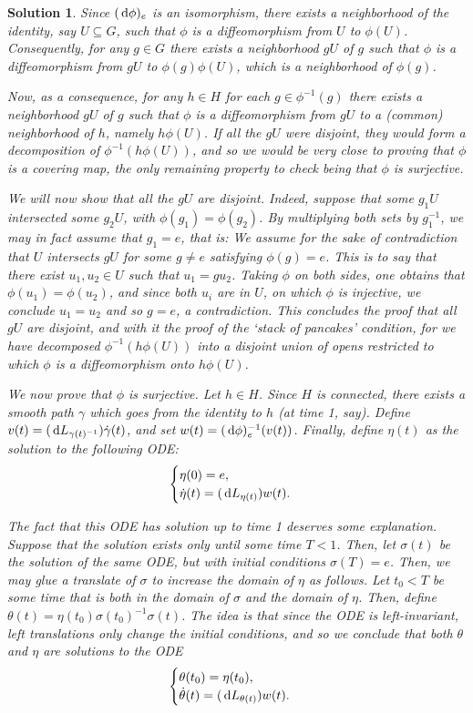 \documentclass{article}
\theoremstyle{nonumberplain}
\newtheorem{sol}{Solution}
\begin{document}
\begin{sol}
Since $(\dl \phi)_e$ is an isomorphism, there exists a neighborhood of the identity, say $U \subseteq G$, such that $\phi$ is a diffeomorphism from $U$ to $\phi(U)$. Consequently, for any $g \in G$ there exists a neighborhood $g U$ of $g$ such that $\phi$ is a diffeomorphism from $g U$ to $\phi(g) \phi(U)$, which is a neighborhood of $\phi(g)$.

Now, as a consequence, for any $h \in H$ for each $g \in \phi^{-1}(g)$ there exists a neighborhood $g U$ of $g$ such that $\phi$ is a diffeomorphism from $g U$ to a (common) neighborhood of $h$, namely $h \phi(U)$. If all the $g U$ were disjoint, they would form a decomposition of $\phi^{-1}(h \phi(U))$, and so we would be very close to proving that $\phi$ is a covering map, the only remaining property to check being that $\phi$ is surjective.

We will now show that all the $g U$ are disjoint. Indeed, suppose that some $g_1 U$ intersected some $g_2 U$, with $\phi(g_1) = \phi(g_2)$. By multiplying both sets by $g_1^{-1}$, we may in fact assume that $g_1 = e$, that is: We assume for the sake of contradiction that $U$ intersects $g U$ for some $g \neq e$ satisfying $\phi(g) = e$. This is to say that there exist $u_1, u_2 \in U$ such that $u_1 = g u_2$. Taking $\phi$ on both sides, one obtains that $\phi(u_1) = \phi(u_2)$, and since both $u_i$ are in $U$, on which $\phi$ is injective, we conclude $u_1 = u_2$ and so $g = e$, a contradiction. This concludes the proof that all $gU$ are disjoint, and with it the proof of the `stack of pancakes' condition, for we have decomposed $\phi^{-1}(h \phi(U))$ into a disjoint union of opens restricted to which $\phi$ is a diffeomorphism onto $h \phi(U)$.

We now prove that $\phi$ is surjective. Let $h \in H$. Since $H$ is connected, there exists a smooth path $\gamma$ which goes from the identity to $h$ (at time 1, say). Define $v(t) = (\dl L_{\gamma(t)^{-1}}) \dot\gamma(t)$, and set $w(t) = (\dl \phi)_e^{-1}(v(t))$. Finally, define $\eta(t)$ as the solution to the following ODE:
\[
\begin{cases}
\eta(0) = e,\\
\dot\eta(t) = (\dl L_{\eta(t)}) w(t).
\end{cases}
\]

The fact that this ODE has solution up to time 1 deserves some explanation. Suppose that the solution exists only until some time $T < 1$. Then, let $\sigma(t)$ be the solution of the same ODE, but with initial conditions $\sigma(T) = e$. Then, we may glue a translate of $\sigma$ to increase the domain of $\eta$ as follows. Let $t_0 < T$ be some time that is both in the domain of $\sigma$ and the domain of $\eta$. Then, define $\theta(t) = \eta(t_0) \sigma(t_0)^{-1} \sigma(t)$. The idea is that since the ODE is left-invariant, left translations only change the initial conditions, and so we conclude that both $\theta$ and $\eta$ are solutions to the ODE
\[
\begin{cases}
\theta(t_0) = \eta(t_0),\\
\dot\theta(t) = (\dl L_{\theta(t)}) w(t).
\end{cases}
\]


\end{sol}
\end{document}
